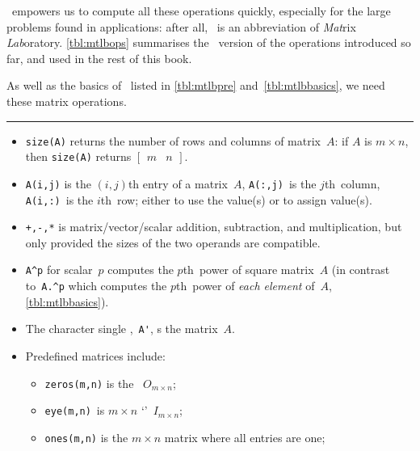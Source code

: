 \script\ empowers us to compute all these operations quickly, especially for the large problems found in applications: after all, \script[1]\ is an abbreviation of \emph{Mat}rix \emph{Lab}oratory.
\autoref{tbl:mtlbops} summarises the \script\ version of the operations introduced so far, and used in the rest of this book.

\begin{table}
\caption{As well as the basics of \script\ listed in \autoref{tbl:mtlbpre} and~\ref{tbl:mtlbbasics},  we need these matrix operations.} \label{tbl:mtlbops}
\hrule
\begin{minipage}{\linewidth}
\begin{itemize}
\item {}\verb|size(A)| returns the number of rows and columns of matrix~\(A\): if \(A\) is \(m\times n\), then \verb|size(A)| returns \(\begin{bmatrix} m&n \end{bmatrix}\).
\item \verb|A(i,j)| is the \((i,j)\)th entry of a matrix~\(A\), \verb|A(:,j)|~is the \(j\)th~column, \verb|A(i,:)|~is the \(i\)th~row; either to use the value(s) or to assign value(s).
\item {}\verb|+,-,*| is matrix\slash vector\slash scalar addition, subtraction, and multiplication, but only provided the sizes of the two operands are compatible.
\item \verb|A^p| for scalar~\(p\) computes the \(p\)th~power of square matrix~\(A\) (in contrast to~\verb|A.^p| which  computes the \(p\)th~power of \emph{each element} of~\(A\), \autoref{tbl:mtlbbasics}).
\item The character single ,~\verb|A'|, s the matrix~\(A\).
\item Predefined matrices include:
\begin{itemize}
\item {}\verb|zeros(m,n)| is the ~\(O_{m\times n}\);
\item {}\verb|eye(m,n)|~is \(m\times n\) `'~\(I_{m\times n}\);
\item {}\verb|ones(m,n)| is the \(m\times n\) matrix where all entries are one;

\end{itemize}
\end{itemize}
\end{minipage}
\end{table}
